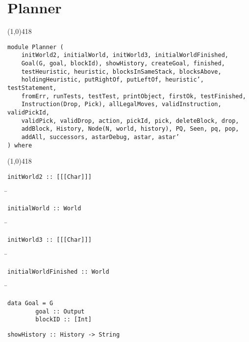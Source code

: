 \section{Planner}
\begin{center}
\line(1,0){418}
\end{center}
\begin{verbatim}
module Planner (
    initWorld2, initialWorld, initWorld3, initialWorldFinished,
    Goal(G, goal, blockId), showHistory, createGoal, finished,
    testHeuristic, heuristic, blocksInSameStack, blocksAbove,
    holdingHeuristic, putRightOf, putLeftOf, heuristic’, testStatement,
    fromErr, runTests, testTest, printObject, firstOk, testFinished,
    Instruction(Drop, Pick), allLegalMoves, validInstruction, validPickId,
    validPick, validDrop, action, pickId, pick, deleteBlock, drop,
    addBlock, History, Node(N, world, history), PQ, Seen, pq, pop,
    addAll, successors, astarDebug, astar, astar’
) where
\end{verbatim}
\begin{center}
\line(1,0){418}
\end{center}
\begin{verbatim}
initWorld2 :: [[[Char]]]
\end{verbatim}
\begin{tabbing}
\hspace*{1cm}\= \kill
\> 
\end{tabbing}
\begin{verbatim}
initialWorld :: World
\end{verbatim}
\begin{tabbing}
\hspace*{1cm}\= \kill
\> 
\end{tabbing}
\begin{verbatim}
initWorld3 :: [[[Char]]]
\end{verbatim}
\begin{tabbing}
\hspace*{1cm}\= \kill
\> 
\end{tabbing}
\begin{verbatim}
initialWorldFinished :: World
\end{verbatim}
\begin{tabbing}
\hspace*{1cm}\= \kill
\> 
\end{tabbing}
\begin{verbatim}
data Goal = G
        goal :: Output
        blockID :: [Int]
\end{verbatim}
\begin{verbatim}
showHistory :: History -> String
\end{verbatim}
